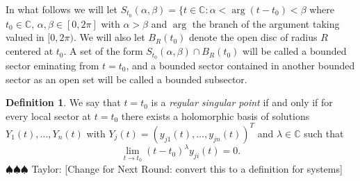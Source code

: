 \documentclass[12pt]{book}
\newcommand{\taylor}[1]{{\color{blue} \sf $\spadesuit\spadesuit\spadesuit$ Taylor: [#1]}}
\numberwithin{equation}{section}
\theoremstyle{definition}
\newtheorem{definition}[theorem]{Definition}
\theoremstyle{remark}
\newcommand{\CC}{\mathbb{C}}
\newcommand{\hol}{\operatorname{Hol}}
\begin{document}
In what follows we will let $S_{t_0}(\alpha,\beta) = \lbrace t \in \CC : \alpha<\arg(t-t_0) <\beta$ where $t_0 \in \CC$, $\alpha,\beta \in [0,2\pi]$ with $\alpha>\beta$ and $\arg$ the branch of the argument taking valued in $[0,2\pi)$.
We will also let $B_R(t_0)$ denote the open disc of radius $R$ centered at $t_0$.
A set of the form $S_{t_0}(\alpha,\beta) \cap B_R(t_0)$ will be called a bounded sector eminating from $t=t_0$, and a bounded sector contained in another bounded sector as an open set will be called a bounded subsector.
\iffalse 
\begin{definition}
Let $S = S_{t_0}(\alpha,\beta) \cap B_R(t_0)$ be a sector of bounded radius eminating from $t_0$ (which is by definition open and doesn't contain $t_0$).
We say that a matrix $\Phi(t) \in M_{m,n}(\hol(S))$ is \emph{regular singular at $t_0$} if and only if for all subsectors $S' \subset S$ of strictly smaller radius and angle there exists some integer $m$ such that 
 $$ \lim_{t \to t_0, t\in S'} \Vert \Phi(t) \Vert  = O( \vert t-t_0 \vert^{-m}).$$
 \end{definition}
\fi

\begin{definition}
	We say that $t=t_0$ is a \emph{regular singular point} if and only if  for every local sector at $t=t_0$ there exists a holomorphic basis of solutions $Y_1(t),\ldots,Y_n(t)$ with $Y_j(t)=(y_{j1}(t),\ldots,y_{jn}(t))^T$ and $\lambda \in \CC$ such that 
	$$ \lim_{t\to t_0} (t-t_0)^{\lambda} y_{ji}(t) =0. $$
	\taylor{Change for Next Round: convert this to a definition for systems}
\end{definition}
\end{document}
